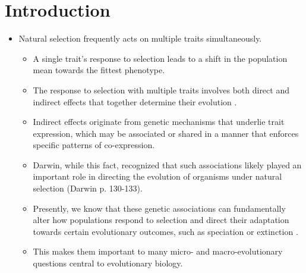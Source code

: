 \documentclass[11pt,one column]{article}
\begin{document}
\section*{Introduction}
\begin{itemize}
\item Natural selection frequently acts on multiple traits simultaneously. 
\begin{itemize}
\item A single trait’s response to selection leads to a shift in the population mean towards the fittest phenotype.
\item The response to selection with multiple traits involves both direct and indirect effects that together determine their evolution \cite{Scarcelli23102007,Lovell2013,Wagner2011}.  
\item Indirect effects originate from genetic mechanisms that underlie trait expression, which may be associated or shared in a manner that enforces specific patterns of co-expression.
\item Darwin, while this fact, recognized that such associations likely played an important role in directing the evolution of organisms under natural selection (Darwin p. 130-133).
\item Presently, we know that these genetic associations can fundamentally alter how populations respond to selection and direct their adaptation towards certain evolutionary outcomes, such as speciation or extinction \cite{Felsenstein1979, Arnold2001, Arnold2008}.
\item This makes them important to many micro- and macro-evolutionary questions central to evolutionary biology.
\end{itemize}


\end{itemize}
\end{document}

